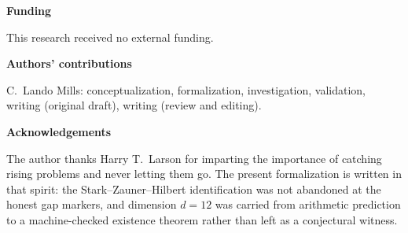 \documentclass[12pt,a4paper]{article}
\begin{document}
\noindent\textbf{Funding}

\noindent
This research received no external funding.

\vspace{1em}

\noindent\textbf{Authors' contributions}

\noindent
C.\ Lando Mills: conceptualization, formalization, investigation, validation,
writing (original draft), writing (review and editing).

\vspace{1em}

\noindent\textbf{Acknowledgements}

\noindent
The author thanks Harry T.\ Larson for imparting the importance of catching rising
problems and never letting them go.
The present formalization is written in that spirit: the Stark--Zauner--Hilbert
identification was not abandoned at the honest gap markers, and dimension $d=12$
was carried from arithmetic prediction to a machine-checked existence theorem
rather than left as a conjectural witness.
\end{document}
